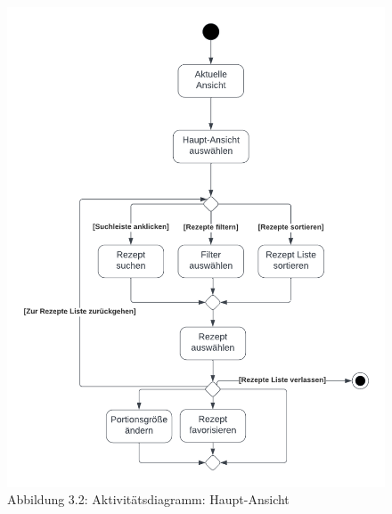 \documentclass[parskip=full]{scrartcl}
\begin{document}
\begin{figure}[!htp]
    \centering
    \includegraphics{images/section3/ActivityDiagramRecipeList.png}
    Abbildung 3.2: Aktivitätsdiagramm: Haupt-Ansicht
    \label{fig:A32}
\end{figure}
\newpage
\end{document}
